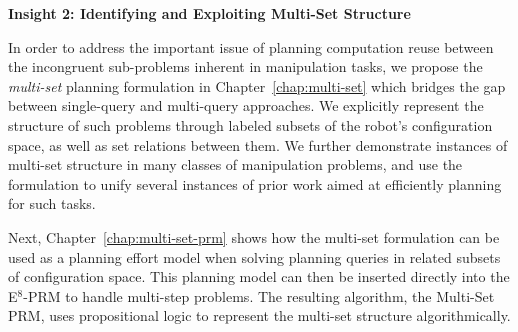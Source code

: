 
\vspace{0.1in}
\noindent
\textbf{Insight 2: Identifying and Exploiting Multi-Set
   Structure}

In order to address the important issue of planning computation
reuse between the incongruent sub-problems inherent in manipulation
tasks,
we propose the \emph{multi-set} planning formulation
in Chapter~\ref{chap:multi-set}
which bridges the gap between single-query and multi-query approaches.
We explicitly represent the structure of such problems
through labeled subsets of the robot's configuration space,
as well as set relations between them.
We further demonstrate instances of multi-set structure
in many classes of manipulation problems,
and use the formulation to unify several instances of
prior work aimed at efficiently planning for such tasks.

Next, Chapter~\ref{chap:multi-set-prm}
shows how the multi-set formulation can be used as a
planning effort model
when solving planning queries in related subsets of configuration space.
This planning model can then be inserted directly into the 
E$^8$-PRM to handle multi-step problems.
The resulting algorithm,
the Multi-Set PRM,
uses propositional logic to represent the multi-set structure
algorithmically.

